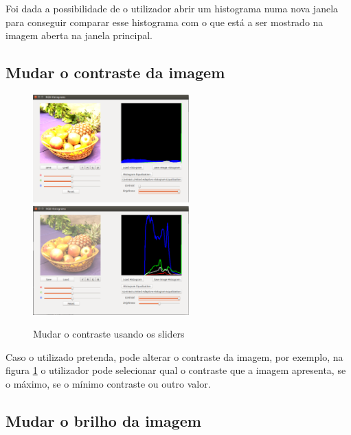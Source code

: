\documentclass[pdftex,12pt,a4paper]{report}
\begin{document}
Foi dada a possibilidade de o utilizador abrir um histograma numa nova janela para conseguir comparar esse histograma com o que está a ser mostrado na imagem aberta na janela principal.

\subsection{Mudar o contraste da imagem}

\begin{figure}[!htb]
\center
 \includegraphics[width=60mm,scale=1]{imagens/maximum_contrast.png}
 \includegraphics[width=60mm,scale=1]{imagens/high_contrast.png}
 \caption{Mudar o contraste usando os sliders}
 \label{fig:contrastes}
\end{figure}

Caso o utilizado pretenda, pode alterar o contraste da imagem, por exemplo, na figura \ref{fig:contrastes} o utilizador pode selecionar qual o contraste que a imagem apresenta, se o máximo, se o mínimo contraste ou outro valor.

\newpage

\subsection{Mudar o brilho da imagem}
\end{document}
